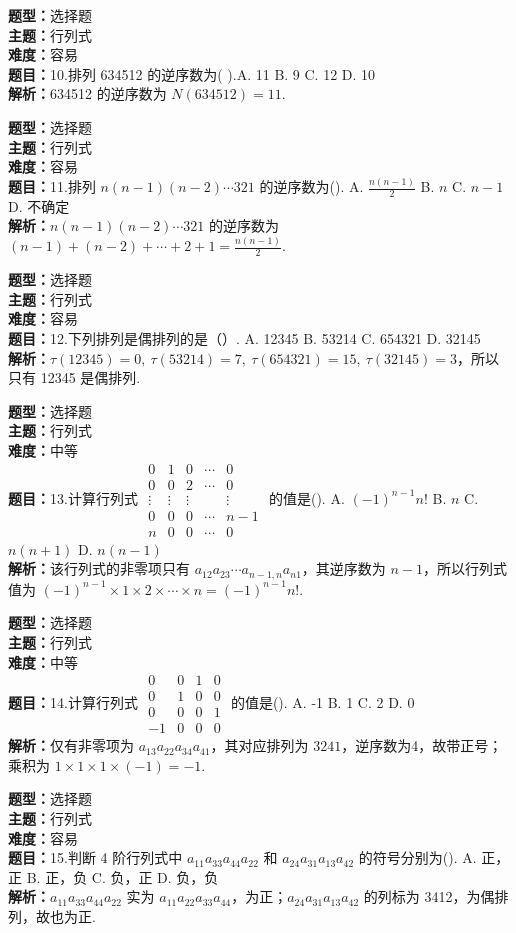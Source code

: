 \documentclass{ctexart}
\newenvironment{question}[5]{%
	\noindent\textbf{题型：}#1\\
	\textbf{主题：}#2\\
	\textbf{难度：}#3\\
	\textbf{题目：}#4\\
	\textbf{解析：}#5\\
	\vspace{1em}
}{}
\begin{document}
	\begin{question}
		{选择题}
		{行列式}
		{容易}
		{10.排列 634512 的逆序数为(  ).A. 11 B. 9 C. 12 D. 10}
		{634512 的逆序数为 \(N(634512)=11\).}
	\end{question}
	
	
	\begin{question}
		{选择题}
		{行列式}
		{容易}
		{11.排列 \(n(n-1)(n-2)\cdots321\) 的逆序数为(\qquad). A. \(\frac{n(n-1)}{2}\) B. \(n\) C. \(n-1\) D. 不确定}
		{\(n(n-1)(n-2)\cdots321\) 的逆序数为 \((n-1)+(n-2)+\cdots+2+1=\frac{n(n-1)}{2}\).}
	\end{question}
	
	\begin{question}
		{选择题}
		{行列式}
		{容易}
		{12.下列排列是偶排列的是（）. A. 12345 B. 53214 C. 654321 D. 32145}
		{\(\tau(12345)=0,\ \tau(53214)=7,\ \tau(654321)=15,\ \tau(32145)=3\)，所以只有 12345 是偶排列. }
	\end{question}
	
	\begin{question}
		{选择题}
		{行列式}
		{中等}
		{13.计算行列式 \(\begin{matrix}0 & 1 & 0 & \cdots & 0 \\ 0 & 0 & 2 & \cdots & 0 \\ \vdots & \vdots & \vdots & & \vdots \\ 0 & 0 & 0 & \cdots & n-1 \\ n & 0 & 0 & \cdots & 0\end{matrix}\) 的值是(\qquad). A. \((-1)^{n-1}n!\) B. \(n\) C. \(n(n+1)\) D. \(n(n-1)\)}
		{该行列式的非零项只有 \(a_{12}a_{23}\cdots a_{n-1,n}a_{n1}\)，其逆序数为 \(n-1\)，所以行列式值为 \((-1)^{n-1}\times1\times2\times\cdots\times n = (-1)^{n-1}n!\). }
	\end{question}
	
	\begin{question}
		{选择题}
		{行列式}
		{中等}
		{14.计算行列式 \(\begin{matrix}0 & 0 & 1 & 0 \\ 0 & 1 & 0 & 0 \\ 0 & 0 & 0 & 1 \\ -1 & 0 & 0 & 0\end{matrix}\) 的值是(\qquad). A. -1 B. 1 C. 2 D. 0}
		{仅有非零项为 \(a_{13}a_{22}a_{34}a_{41}\)，其对应排列为 \(3241\)，逆序数为4，故带正号；乘积为 \(1\times1\times1\times(-1) = -1\). }
	\end{question}
	
	\begin{question}
		{选择题}
		{行列式}
		{容易}
		{15.判断 4 阶行列式中 \(a_{11}a_{33}a_{44}a_{22}\) 和 \(a_{24}a_{31}a_{13}a_{42}\) 的符号分别为(\qquad). A. 正，正 B. 正，负 C. 负，正 D. 负，负}
		{\(a_{11}a_{33}a_{44}a_{22}\) 实为 \(a_{11}a_{22}a_{33}a_{44}\)，为正；\(a_{24}a_{31}a_{13}a_{42}\) 的列标为 3412，为偶排列，故也为正. }
	\end{question}
	
\end{document}
